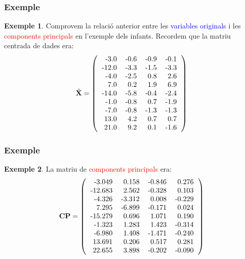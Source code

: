 \documentclass[12pt,t]{beamer}
\newcommand{\red}[1]{\textcolor{red}{#1}}
\newcommand{\blue}[1]{\textcolor{blue}{#1}}
\theoremstyle{plain}
\theoremstyle{definition}
\newtheorem{exemple}{Exemple}
\begin{document}
\begin{frame}
\frametitle{Exemple}
\begin{exemple}
Comprovem la relació anterior entre les \blue{variables originals} i les \red{components principals} en l'exemple dels infants.
Recordem que la matriu centrada de dades era:
\[
\tilde{\mathbf{X}}=\left(
\begin{tabular}{rrrr}
  -3.0 & -0.6 & -0.9 & -0.1 \\ 
  -12.0 & -3.3 & -1.5 & -3.3 \\ 
  -4.0 & -2.5 & 0.8 & 2.6 \\ 
  7.0 & 0.2 & 1.9 & 6.9 \\ 
  -14.0 & -5.8 & -0.4 & -2.4 \\ 
  -1.0 & -0.8 & 0.7 & -1.9 \\ 
  -7.0 & -0.8 & -1.3 & -1.3 \\ 
  13.0 & 4.2 & 0.7 & 0.7 \\ 
  21.0 & 9.2 & 0.1 & -1.6 \\ 
  \end{tabular}\right)
\]
\end{exemple}
\end{frame}

\begin{frame}
\frametitle{Exemple}
\begin{exemple}
La matriu de \red{components principals} era:
\[
{\mathbf{CP}}=\left(
\begin{tabular}{rrrr}
  -3.049 & 0.158 & -0.846 & 0.276 \\ 
  -12.683 & 2.562 & -0.328 & 0.103 \\ 
  -4.326 & -3.312 & 0.008 & -0.229 \\ 
  7.295 & -6.899 & -0.171 & 0.024 \\ 
  -15.279 & 0.696 & 1.071 & 0.190 \\ 
  -1.323 & 1.283 & 1.423 & -0.314 \\ 
  -6.980 & 1.408 & -1.471 & -0.240 \\ 
  13.691 & 0.206 & 0.517 & 0.281 \\ 
  22.655 & 3.898 & -0.202 & -0.090 \\ 
  \end{tabular}\right)
\]
\end{exemple}
\end{frame}
\end{document}
